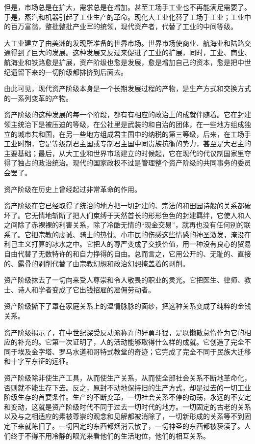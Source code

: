 \documentclass[UTF8]{ctexart}
\begin{document}
但是，市场总是在扩大，需求总是在增加。甚至工场手工业也不再能满足需要了。于是，蒸汽和机器引起了工业生产的革命。现化大工业化替了工场手工业；工业中的百万富翁，整批整批产业军的统领，现代资产者，代替了工业的中间等级。

大工业建立了由美洲的发现所准备的世界市场。世界市场使商业、航海业和陆路交通得到了巨大的发展。这种发展又反过来促进了工业的扩展，同时，工业、商业、航海业和铁路愈是扩展，资产阶级也愈是发展，愈是增加自己的资本，愈是把中世纪遗留下来的一切阶级都排挤到后面去。

由此可见，现代资产阶级本身是一个长期发展过程的产物，是生产方式和交换方式的一系列变革的产物。

资产阶级的这种发展的每一个阶段，都有有相应的政治上的成就伴随着。它在封建领主统治下是被压迫的等级，在公社里是武装的和自治的团体，在一些地方组成独立的城市共和国，在另一些地方组成君主国中的纳税的第三等级，后来，在工场手工业时期，它是等级制君主国或专制君主国中同贵族抗衡的势力，甚至是大君主的主要基础；最后，从大工业和世界市场建立的时候起，它在现代的代议制国家里夺得了独占的政治统治。现代的国家政权不过是管理整个资产阶级的共同事务的委员会罢了。

资产阶级在历史上曾经起过非常革命的作用。

资产阶级在它已经取得了统治的地方把一切封建的、宗法的和田园诗般的关系都破坏了。它无情地斩断了把人们束缚于天然首长的形形色色的封建羁绊，它使人和人之间除了赤裸裸的利害关系，除了冷酷无情的“现金交易”，就再也没有任何别的联系了。它把宗教的虔诚、骑士的热忱、小市民的伤感这些情感的神圣激发，淹没在利己主义打算的冰水之中。它把人的尊严变成了交换价值，用一种没有良心的贸易自由代替了无数特许的和自力挣得的自由。总而言之，它用公开的、无耻的、直接的、露骨的剥削代替了由宗教幻想和政治幻想掩盖着的剥削。

资产阶级抹去了一切向来受人尊崇和令人敬畏的职业的灵光。它把医生、律师、教士、诗人和学者变成了它出钱招雇的雇佣劳动者。

资产阶级撕下了罩在家庭关系上的温情脉脉的面纱，把这种关系变成了纯粹的金钱关系。

资产阶级揭示了，在中世纪深受反动派称许的好勇斗狠，是以懒散怠惰作为它的相应的补充的。它第一次证明了，人的活动能够取得什么样的成就。它创造了完全不同于埃及金字塔、罗马水道和哥特式教堂的奇迹；它完成了完全不同于民族大迁移和十字军东征的远征。

资产阶级除非使生产工具，从而使生产关系，从而使全部社会关系不断地革命化，否则就不能生存下去。反之，原封不动地保持旧的生产方式，却是过去的一切工业阶级生存的首要条件。生产的不断变革，一切社会关系不停的动荡，永远的不安定和变动，这就是资产阶级时代不同于过去一切时代的地方。一切固定的古老的关系以及与之相适应的素被尊崇的观念和见解都被消除了，一切新形成的关系等不到固定下来就陈旧了。一切固定的东西都烟消云散了，一切神圣的东西都被亵渎了。人们终于不得不用冷静的眼光来看他们的生活地位，他们的相互关系。
\end{document}

